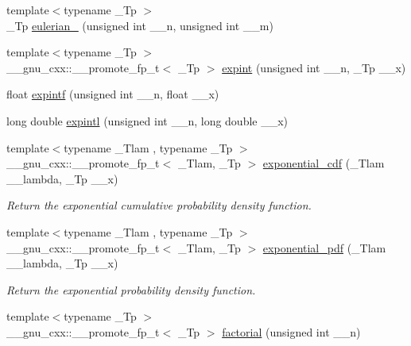 \begin{DoxyCompactItemize}
\item 
{\footnotesize template$<$typename \+\_\+\+Tp $>$ }\\\+\_\+\+Tp \hyperlink{group__gnu__math__spec__func_ga9bc456941d5e35cf54ec9c50f2e52884}{eulerian\+\_} (unsigned int \+\_\+\+\_\+n, unsigned int \+\_\+\+\_\+m)
\item 
{\footnotesize template$<$typename \+\_\+\+Tp $>$ }\\\+\_\+\+\_\+gnu\+\_\+cxx\+::\+\_\+\+\_\+promote\+\_\+fp\+\_\+t$<$ \+\_\+\+Tp $>$ \hyperlink{group__gnu__math__spec__func_ga2cfc699129ceac9cfed87c61e6dc0e08}{expint} (unsigned int \+\_\+\+\_\+n, \+\_\+\+Tp \+\_\+\+\_\+x)
\item 
float \hyperlink{group__gnu__math__spec__func_ga85751691a29807d99e990fcba61312f3}{expintf} (unsigned int \+\_\+\+\_\+n, float \+\_\+\+\_\+x)
\item 
long double \hyperlink{group__gnu__math__spec__func_ga720ca0b275784c8b82193f427a2b3553}{expintl} (unsigned int \+\_\+\+\_\+n, long double \+\_\+\+\_\+x)
\item 
{\footnotesize template$<$typename \+\_\+\+Tlam , typename \+\_\+\+Tp $>$ }\\\+\_\+\+\_\+gnu\+\_\+cxx\+::\+\_\+\+\_\+promote\+\_\+fp\+\_\+t$<$ \+\_\+\+Tlam, \+\_\+\+Tp $>$ \hyperlink{group__gnu__math__spec__func_ga20e07d9a4ba13fa11b269cad45d3dd90}{exponential\+\_\+cdf} (\+\_\+\+Tlam \+\_\+\+\_\+lambda, \+\_\+\+Tp \+\_\+\+\_\+x)
\begin{DoxyCompactList}\small\item\em Return the exponential cumulative probability density function. \end{DoxyCompactList}\item 
{\footnotesize template$<$typename \+\_\+\+Tlam , typename \+\_\+\+Tp $>$ }\\\+\_\+\+\_\+gnu\+\_\+cxx\+::\+\_\+\+\_\+promote\+\_\+fp\+\_\+t$<$ \+\_\+\+Tlam, \+\_\+\+Tp $>$ \hyperlink{group__gnu__math__spec__func_ga0b3746456b0eb5cc066b2c13906c6000}{exponential\+\_\+pdf} (\+\_\+\+Tlam \+\_\+\+\_\+lambda, \+\_\+\+Tp \+\_\+\+\_\+x)
\begin{DoxyCompactList}\small\item\em Return the exponential probability density function. \end{DoxyCompactList}\item 
{\footnotesize template$<$typename \+\_\+\+Tp $>$ }\\\+\_\+\+\_\+gnu\+\_\+cxx\+::\+\_\+\+\_\+promote\+\_\+fp\+\_\+t$<$ \+\_\+\+Tp $>$ \hyperlink{group__gnu__math__spec__func_ga48bc268969bfc03eaeaf4bfd457bb25c}{factorial} (unsigned int \+\_\+\+\_\+n)

\end{DoxyCompactItemize}

